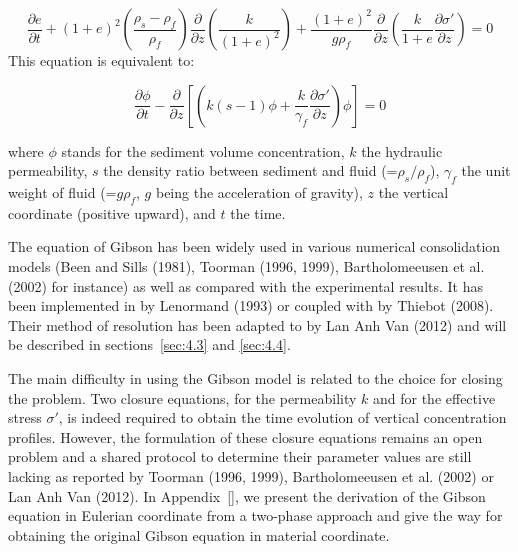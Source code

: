 \begin{equation}\label{eq:gib2}
\dfrac{\partial e}{\partial t} +(1+e)^2 \left(\dfrac{\rho_s-\rho_f}{\rho_f}\right) 
\dfrac{\partial}{\partial z} \left(\dfrac{k}{(1+e)^2}\right) + 
\dfrac{(1+e)^2}{g\rho_f}\dfrac{\partial}{\partial z} 
\left(\dfrac{k}{1+e} \dfrac{\partial \sigma'}{\partial z} \right) = 0 
\end{equation}%
This equation is equivalent to:

\begin{equation}\label{eq:gib3}
\dfrac{\partial \phi}{\partial t} - 
\dfrac{\partial}{\partial z} \left[\left(k(s-1)\phi+\dfrac{k}{\gamma_f}\dfrac{\partial \sigma'}{\partial z} \right)\phi\right] = 0 
\end{equation}%

where $\phi$ stands for the sediment volume
concentration, $k$ the hydraulic permeability, $s$ the density ratio between sediment and fluid (=$\rho_s/\rho_f$), 
$\gamma_f$ the unit weight of fluid (=$g\rho_f$, $g$ being the acceleration of gravity), $z$ the vertical coordinate (positive upward), 
and $t$ the time.

The equation of Gibson has been widely used in various numerical
consolidation models (Been and Sills (1981), Toorman (1996, 1999),
Bartholomeeusen et al. (2002) for instance) as well as compared with the
experimental results. It has been implemented in \telddd by Lenormand
(1993) or coupled with \teldd by Thiebot (2008). Their method of
resolution has been adapted to \sisyphe by Lan Anh Van (2012) and will be
described in sections~\ref{sec:4.3} and \ref{sec:4.4}.

The main difficulty in using the Gibson model is related to the choice for
closing the problem. Two closure equations, for the permeability $k$ and for
the effective stress $\sigma'$, is indeed required to obtain the time
evolution of vertical concentration profiles. However, the formulation of
these closure equations remains an open problem and a shared protocol to
determine their parameter values are still lacking as reported by Toorman
(1996, 1999), Bartholomeeusen et al. (2002) or Lan Anh Van (2012). In Appendix~\ref{}, we present the derivation of the Gibson equation in Eulerian coordinate
from a two-phase approach and give the way for obtaining the original Gibson
equation in material coordinate.

